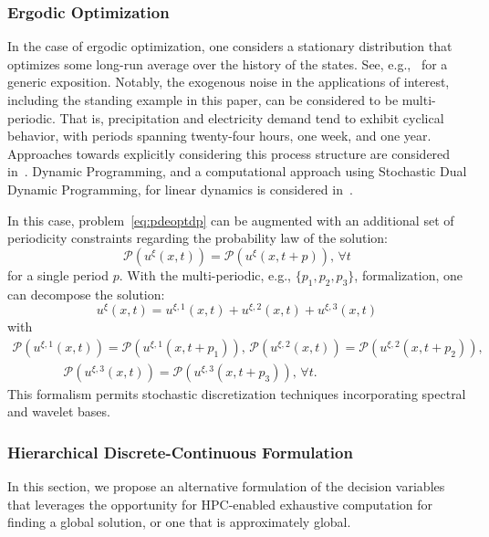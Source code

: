\documentclass{article}
\newcommand{\1}{\mathds{1}}          %
\theoremstyle{definition}
\begin{document}
\begin{sloppypar}
\subsubsection{Ergodic Optimization}

In the case of ergodic optimization, one considers a stationary distribution that optimizes some long-run average over the history of the states. See, e.g.,~\cite{jenkinson2019ergodic} for a generic exposition. Notably, the exogenous noise in the applications of interest, including the standing example in this paper, can be considered to be multi-periodic. That is, precipitation and electricity demand tend to exhibit cyclical behavior, with periods spanning twenty-four hours, one week, and one year. Approaches towards explicitly considering this process structure are considered in~\cite{kungurtsev2025quasi}. Dynamic Programming, and a computational approach using Stochastic Dual Dynamic Programming, for linear dynamics is considered in~\cite{shapiro2020periodical}. 

In this case, problem~\eqref{eq:pdeoptdp} can be augmented with an additional set of periodicity constraints regarding the probability law of the solution:
\[
\mathcal{P}\left(u^{\xi}(x,t)\right)=\mathcal{P}\left(u^{\xi}(x,t+p)\right),\,\forall t
\]
for a single period $p$. With the multi-periodic, e.g., $\{p_1,p_2,p_3\}$, formalization, one can decompose the solution:
\[
u^{\xi}(x,t) = u^{\xi,1}(x,t)+u^{\xi,2}(x,t)+u^{\xi,3}(x,t)
\]
with
\[
\begin{array}{l}
\mathcal{P}\left(u^{\xi,1}(x,t)\right)=\mathcal{P}\left(u^{\xi,1}(x,t+p_1)\right),\,\mathcal{P}\left(u^{\xi,2}(x,t)\right)=\mathcal{P}\left(u^{\xi,2}(x,t+p_2)\right),\\ \qquad\qquad \mathcal{P}\left(u^{\xi,3}(x,t)\right)=\mathcal{P}\left(u^{\xi,3}(x,t+p_3)\right),\,\forall t.
\end{array}
\]
This formalism permits stochastic discretization techniques incorporating spectral and wavelet bases. 

\subsubsection{Hierarchical Discrete-Continuous Formulation}

In this section, we propose an alternative formulation of the decision variables that leverages the opportunity for HPC-enabled exhaustive computation for finding a global solution, or one that is approximately global. 


\end{sloppypar}
\end{document}
